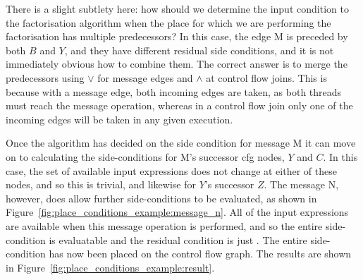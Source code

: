 There is a slight subtlety here: how should we determine the input
condition to the factorisation algorithm when the place for which we
are performing the factorisation has multiple predecessors?  In this
case, the edge M is preceded by both $B$ and $Y$, and they have
different residual side conditions, and it is not immediately obvious
how to combine them.  The correct answer is to merge the predecessors
using $\vee$ for message edges and $\wedge$ at control flow joins.
This is because with a message edge, both incoming edges are taken, as
both threads must reach the message operation, whereas in a control
flow join only one of the incoming edges will be taken in any given
execution.  

Once the algorithm has decided on the side condition for message M it
can move on to calculating the side-conditions for M's successor \gls{cfg}
nodes, $Y$ and $C$.  In this case, the set of available input
expressions does not change at either of these nodes, and so this is
trivial, and likewise for $Y$'s successor $Z$.  The message N,
however, does allow further side-conditions to be evaluated, as shown
in Figure~\ref{fig:place_conditions_example:message_n}.  All of the
input expressions are available when this message operation is
performed, and so the entire side-condition is evaluatable and the
residual condition is just \true.  The entire side-condition has now
been placed on the control flow graph.  The results are shown in
Figure~\ref{fig:place_conditions_example:result}.


